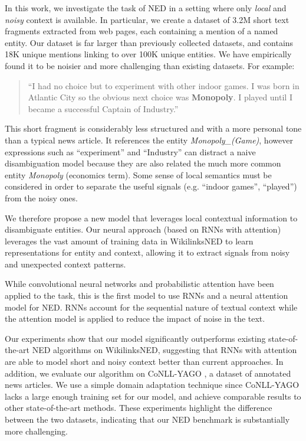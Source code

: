 \documentclass[11pt,a4paper]{article}
\begin{document}
	In this work, we investigate the task of NED in a setting where only \textit{local} and \textit{noisy} context is available. In particular, we create a dataset of 3.2M short text fragments extracted from web pages, each containing a mention of a named entity. Our dataset is far larger than previously collected datasets, and contains 18K unique mentions linking to over 100K unique entities. We have empirically found it to be noisier and more challenging than existing datasets. For example:
	\begin{quote}
		``I had no choice but to experiment with other indoor games. I was born in Atlantic City so the obvious next choice was \textbf{Monopoly}. I played until I became a successful Captain of Industry.''
	\end{quote}
	This short fragment is considerably less structured and with a more personal tone than a typical news article. It references the entity \textit{Monopoly\_(Game)}, however expressions such as ``experiment'' and ``Industry'' can distract a naive disambiguation model because they are also related the much more common entity \textit{Monopoly} (economics term). Some sense of local semantics must be considered in order to separate the useful signals (e.g. ``indoor games'', ``played'') from the noisy ones.
	
	We therefore propose a new model that leverages local contextual information to disambiguate entities. Our neural approach (based on RNNs with attention) leverages the vast amount of training data in WikilinksNED to learn representations for entity and context, allowing it to extract signals from noisy and unexpected context patterns. 
	
	While convolutional neural networks \cite{sun2015modeling,francis2016capturing} and probabilistic attention \cite{Lazic2015} have been applied to the task, this is the first model to use RNNs and a neural attention model for NED. RNNs account for the sequential nature of textual context while the attention model is applied to reduce the impact of noise in the text. 

	Our experiments show that our model significantly outperforms existing state-of-the-art NED algorithms on WikilinksNED, suggesting that RNNs with attention are able to model short and noisy context better than current approaches. In addition, we evaluate our algorithm on CoNLL-YAGO \cite{hoffart2011robust}, a dataset of annotated news articles. We use a simple domain adaptation technique since CoNLL-YAGO lacks a large enough training set for our model, and achieve comparable results to other state-of-the-art methods. These experiments highlight the difference between the two datasets, indicating that our NED benchmark is substantially more challenging.
	
\end{document}

